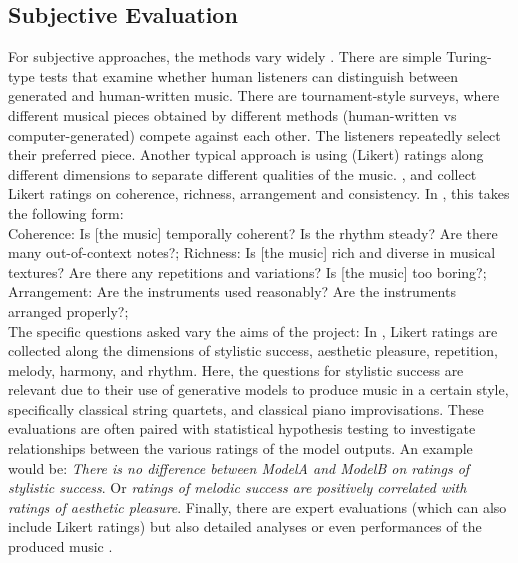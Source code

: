 \subsection{Subjective Evaluation}
For subjective approaches, the methods vary widely \cite{Xiong_Wang_ai_eval_methods_2023}. There are simple Turing-type tests that examine whether human listeners can distinguish between generated and human-written music. There are tournament-style surveys, where different musical pieces obtained by different methods (human-written vs computer-generated) compete against each other. The listeners repeatedly select their preferred piece.\cite{Huang_Vaswani_Uszkoreit_Shazeer_Simon_Hawthorne_Dai_Hoffman_Dinculescu_Eck_2018}\cite{Rütte_figaro_2023}
Another typical approach is using (Likert) ratings along different dimensions to separate different qualities of the music. \cite{Dong_Chen_MMT_Kirkpatrick_2023}, \cite{Yu_Lu_Wang_Hu_Tan_Ye_Zhang_museformer_2022} and \cite{Chen_Smith_Spijkervet_Wang_Zou_Li_Kong_Du_2024} collect Likert ratings on coherence, richness, arrangement and consistency. In \cite{Dong_Chen_MMT_Kirkpatrick_2023}, this takes the following form: \\
Coherence: Is [the music] temporally coherent? Is the rhythm steady? Are there many out-of-context notes?;
Richness: Is [the music] rich and diverse in musical textures? Are there any repetitions and variations? Is [the music] too boring?; 
Arrangement: Are the instruments used reasonably? Are the instruments arranged properly?; \\
The specific questions asked vary the aims of the project: 
In \cite{Yin_Reuben_Stepney_Collins_2023}, Likert ratings are collected along the dimensions of stylistic success, aesthetic pleasure, repetition, melody, harmony, and rhythm. Here, the questions for stylistic success are relevant due to their use of generative models to produce music in a certain style, specifically classical string quartets, and classical piano improvisations. 
These evaluations are often paired with statistical hypothesis testing to investigate relationships between the various ratings of the model outputs. An example would be: \textit{There is no difference between ModelA and ModelB on ratings of stylistic success}. Or \textit{ratings of melodic success are positively correlated with ratings of aesthetic pleasure}.
Finally, there are expert evaluations (which can also include Likert ratings) but also detailed analyses or even performances of the produced music \cite{Sturm_Ben-Tal_2016} \cite{Yin_Reuben_Stepney_Collins_2023}. \\

